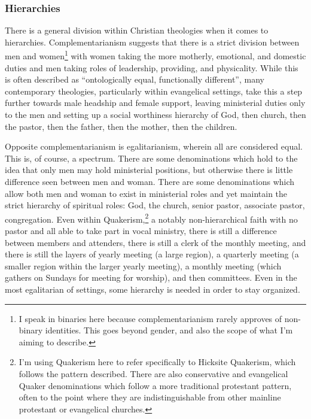 \hypertarget{hierarchies}{%
\subsubsection*{Hierarchies}\label{hierarchies}}

There is a general division within Christian theologies when it comes to hierarchies. Complementarianism suggests that there is a strict division between men and women\footnote{I speak in binaries here because complementarianism rarely approves of non-binary identities. This goes beyond gender, and also the scope of what I'm aiming to describe.} with women taking the more motherly, emotional, and domestic duties and men taking roles of leadership, providing, and physicality. While this is often described as ``ontologically equal, functionally different'', many contemporary theologies, particularly within evangelical settings, take this a step further towards male headship and female support, leaving ministerial duties only to the men and setting up a social worthiness hierarchy of God, then church, then the pastor, then the father, then the mother, then the children.

Opposite complementarianism is egalitarianism, wherein all are considered equal. This is, of course, a spectrum. There are some denominations which hold to the idea that only men may hold ministerial positions, but otherwise there is little difference seen between men and woman. There are some denominations which allow both men and woman to exist in ministerial roles and yet maintain the strict hierarchy of spiritual roles: God, the church, senior pastor, associate pastor, congregation. Even within Quakerism,\footnote{I'm using Quakerism here to refer specifically to Hicksite Quakerism, which follows the pattern described. There are also conservative and evangelical Quaker denominations which follow a more traditional protestant pattern, often to the point where they are indistinguishable from other mainline protestant or evangelical churches.} a notably non-hierarchical faith with no pastor and all able to take part in vocal ministry, there is still a difference between members and attenders, there is still a clerk of the monthly meeting, and there is still the layers of yearly meeting (a large region), a quarterly meeting (a smaller region within the larger yearly meeting), a monthly meeting (which gathers on Sundays for meeting for worship), and then committees. Even in the most egalitarian of settings, some hierarchy is needed in order to stay organized.
